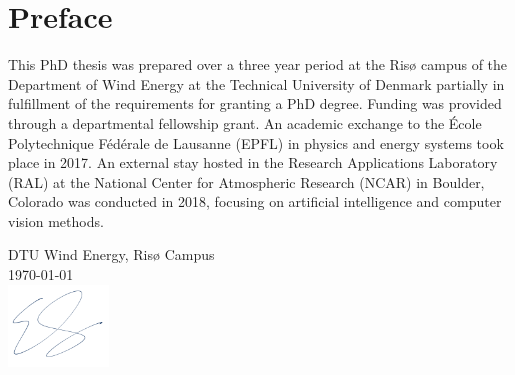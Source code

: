 \chapter{Preface}
\label{sec:preface}


This PhD thesis was prepared over a three year period at the Ris{\o} campus of the Department of Wind Energy at the Technical University of Denmark partially in fulfillment of the requirements for granting a PhD degree. Funding was provided through a departmental fellowship grant. An academic exchange to the {\'E}cole Polytechnique F{\'e}d{\'e}rale de Lausanne (EPFL) in physics and energy systems took place in 2017. An external stay hosted in the Research Applications Laboratory (RAL) at the National Center for Atmospheric Research (NCAR) in Boulder, Colorado was conducted in 2018, focusing on artificial intelligence and computer vision methods.

\vfill

{
\flushright
    DTU Wind Energy, Ris{\o} Campus\\[0.2cm]
    \today\\[1cm]
    \hspace{3cm}\includegraphics[width=0.2\textwidth]{graphics/signature.png}\\[1cm]
\begin{flushright}
    \thesisauthor{}
\end{flushright}
}
